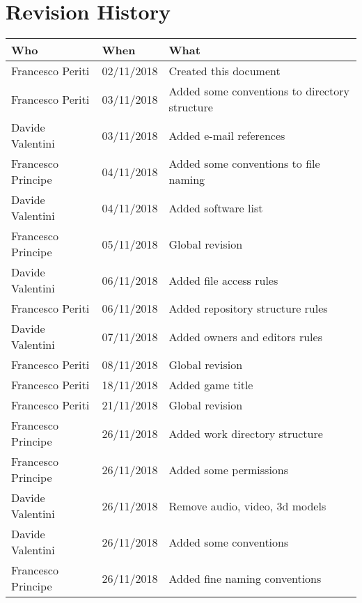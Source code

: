 \section*{Revision History}
\begin{table}[H]
\centering
  \begin{tabularx}{\textwidth}{|l|l|X|}
\hline
\cellcolor{lightgray}\textbf{Who} & \cellcolor{lightgray}\textbf{When} & \cellcolor{lightgray}\textbf{What} \\ \hline
Francesco Periti & 02/11/2018 & Created this document \\ \hline
Francesco Periti & 03/11/2018 & Added some conventions to directory structure \\ \hline
Davide Valentini & 03/11/2018 & Added e-mail references \\ \hline
Francesco Principe & 04/11/2018 & Added some conventions to file naming \\ \hline
Davide Valentini & 04/11/2018 & Added software list \\ \hline
Francesco Principe & 05/11/2018 & Global revision \\ \hline
Davide Valentini & 06/11/2018 & Added file access rules \\ \hline
Francesco Periti & 06/11/2018 & Added repository structure rules \\ \hline
Davide Valentini & 07/11/2018 & Added owners and editors rules \\ \hline
Francesco Periti & 08/11/2018 & Global revision \\ \hline
Francesco Periti & 18/11/2018 & Added game title \\ \hline
Francesco Periti & 21/11/2018 & Global revision \\ \hline
Francesco Principe & 26/11/2018 & Added work directory structure \\ \hline
Francesco Principe & 26/11/2018 & Added some permissions \\ \hline
Davide Valentini & 26/11/2018 & Remove audio, video, 3d models \\ \hline
Davide Valentini & 26/11/2018 & Added some conventions \\ \hline
Francesco Principe & 26/11/2018 & Added fine naming conventions\\ \hline

\end{tabularx}
\end{table}
